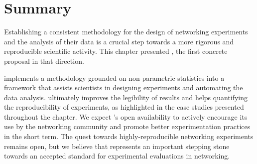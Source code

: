 
\section{Summary}

Establishing a consistent methodology for the design of networking experiments and the analysis of their data is a crucial step towards a more rigorous and reproducible scientific activity.
This chapter presented \triscale, the first concrete proposal in that direction.

\triscale implements a methodology grounded on non-parametric statistics into a framework that assists scientists in designing experiments and automating the data analysis.
\triscale ultimately improves the legibility of results and helps quantifying the reproducibility of experiments, as highlighted in the case studies presented throughout the chapter.
We expect \triscale's open availability to actively encourage its use by the networking community and promote better experimentation practices in the short term.
The quest towards highly-reproducible networking experiments remains open, but we believe that \triscale represents an important stepping stone towards an accepted standard for experimental evaluations in networking.
